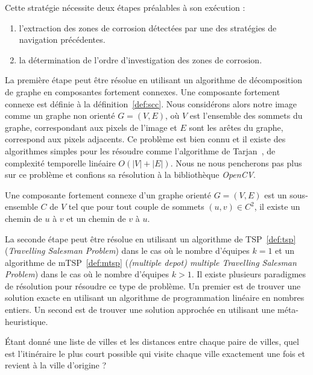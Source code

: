 \documentclass[francais,RandD]{rapportPFE}
\begin{document}
				Cette stratégie nécessite deux étapes préalables à son exécution :
				\begin{enumerate}
					\item l'extraction des zones de corrosion détectées par une des stratégies de navigation précédentes.
					\item la détermination de l'ordre d'investigation des zones de corrosion.
				\end{enumerate}

				La première étape peut être résolue en utilisant un algorithme de décomposition de graphe en composantes fortement connexes.
				Une composante fortement connexe est définie à la définition~\ref{def:scc}.
				Nous considérons alors notre image comme un graphe non orienté $G = (V, E)$, où  $V$ est l'ensemble des sommets du graphe, correspondant aux pixels de l'image et $E$ sont les arêtes du graphe, correspond aux pixels adjacents.
				Ce problème est bien connu et il existe des algorithmes simples pour les résoudre comme l'algorithme de Tarjan~\cite{enwiki:1148118528}, de complexité temporelle linéaire $O(|V| + |E|)$.
				Nous ne nous pencherons pas plus sur ce problème et confions sa résolution à la bibliothèque \textit{OpenCV}.

				\begin{Definition}
					\label{def:scc}
					Une composante fortement connexe d'un graphe orienté $G = (V, E)$ est un sous-ensemble $C$ de $V$ tel que pour tout couple de sommets $(u, v) \in C^2$, il existe un chemin de $u$ à $v$ et un chemin de $v$ à $u$.
				\end{Definition}

				La seconde étape peut être résolue en utilisant un algorithme de TSP~\ref{def:tsp} (\textit{Travelling Salesman Problem}) dans le cas où le nombre d'équipes $k = 1$ et un algorithme de mTSP~\ref{def:mtsp} (\textit{(multiple depot) multiple Travelling Salesman Problem}) dans le cas où le nombre d'équipes $k > 1$.
				Il existe plusieurs paradigmes de résolution pour résoudre ce type de problème.
				Un premier est de trouver une solution exacte en utilisant un algorithme de programmation linéaire en nombres entiers.
				Un second est de trouver une solution approchée en utilisant une méta-heuristique.

				\begin{Definition}
					\label{def:tsp}
					Étant donné une liste de villes et les distances entre chaque paire de villes, quel est l'itinéraire le plus court possible qui visite chaque ville exactement une fois et revient à la ville d'origine ?
				\end{Definition}
\end{document}
